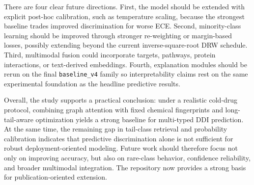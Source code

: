 \documentclass[12pt,a4paper]{report}
\begin{document}
There are four clear future directions. First, the model should be extended with explicit post-hoc calibration, such as temperature scaling, because the strongest baseline trades improved discrimination for worse ECE. Second, minority-class learning should be improved through stronger re-weighting or margin-based losses, possibly extending beyond the current inverse-square-root DRW schedule. Third, multimodal fusion could incorporate targets, pathways, protein interactions, or text-derived embeddings. Fourth, explanation modules should be rerun on the final \texttt{baseline\_v4} family so interpretability claims rest on the same experimental foundation as the headline predictive results.

Overall, the study supports a practical conclusion: under a realistic cold-drug protocol, combining graph attention with fixed chemical fingerprints and long-tail-aware optimization yields a strong baseline for multi-typed DDI prediction. At the same time, the remaining gap in tail-class retrieval and probability calibration indicates that predictive discrimination alone is not sufficient for robust deployment-oriented modeling. Future work should therefore focus not only on improving accuracy, but also on rare-class behavior, confidence reliability, and broader multimodal integration. The repository now provides a strong basis for publication-oriented extension.
\end{document}
